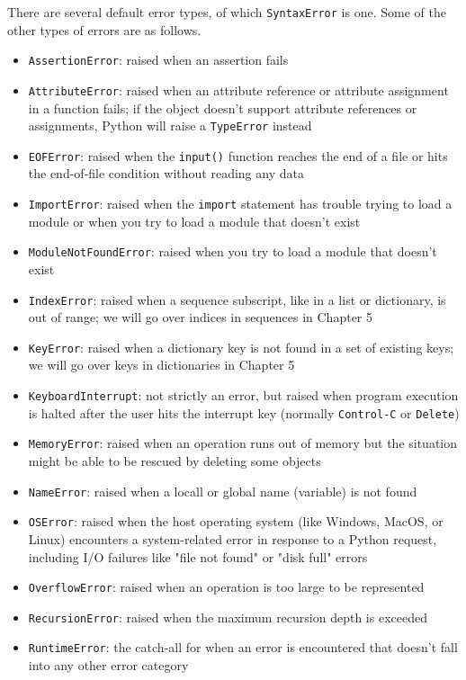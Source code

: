 There are several default error types, of which \verb|SyntaxError| is one. Some of the other types of errors are as follows.
\begin{itemize}
    \item \verb|AssertionError|: raised when an assertion fails
    \item \verb|AttributeError|: raised when an attribute reference or attribute assignment in a function fails; if the object doesn't support attribute references or assignments, Python will raise a \verb|TypeError| instead
    \item \verb|EOFError|: raised when the \verb|input()| function reaches the end of a file or hits the end-of-file condition without reading any data
    \item \verb|ImportError|: raised when the \verb|import| statement has trouble trying to load a module or when you try to load a module that doesn't exist
    \item \verb|ModuleNotFoundError|: raised when you try to load a module that doesn't exist
    \item \verb|IndexError|: raised when a sequence subscript, like in a list or dictionary, is out of range; we will go over indices in sequences in Chapter 5
    \item \verb|KeyError|: raised when a dictionary key is not found in a set of existing keys; we will go over keys in dictionaries in Chapter 5
    \item \verb|KeyboardInterrupt|: not strictly an error, but raised when program execution is halted after the user hits the interrupt key (normally \verb|Control-C| or \verb|Delete|)
    \item \verb|MemoryError|: raised when an operation runs out of memory but the situation might be able to be rescued by deleting some objects
    \item \verb|NameError|: raised when a locall or global name (variable) is not found
    \item \verb|OSError|: raised when the host operating system (like Windows, MacOS, or Linux) encounters a system-related error in response to a Python request, including I/O failures like "file not found" or "disk full" errors
    \item \verb|OverflowError|: raised when an  operation is too large to be represented
    \item \verb|RecursionError|: raised when the maximum recursion depth is exceeded
    \item \verb|RuntimeError|: the catch-all for when an error is encountered that doesn't fall into any other error category

\end{itemize}
